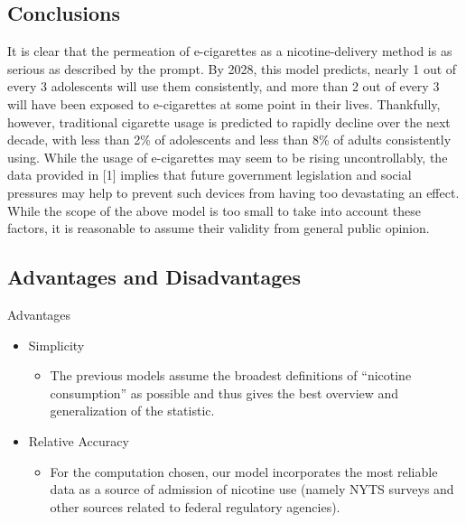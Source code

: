 \subsection{Conclusions}

It is clear that the permeation of e-cigarettes as a nicotine-delivery method is as serious as described by the prompt. By 2028, this model predicts, nearly 1 out of every 3 adolescents will use them consistently, and more than 2 out of every 3 will have been exposed to e-cigarettes at some point in their lives. Thankfully, however, traditional cigarette usage is predicted to rapidly decline over the next decade, with less than 2\% of adolescents and less than 8\% of adults consistently using. While the usage of e-cigarettes may seem to be rising uncontrollably, the data provided in [1] implies that future government legislation and social pressures may help to prevent such devices from having too devastating an effect. While the scope of the above model is too small to take into account these factors, it is reasonable to assume their validity from general public opinion. 

\subsection{Advantages and Disadvantages}

Advantages
\begin{itemize}
    \item Simplicity
    \begin{itemize}
        \item The previous models assume the broadest definitions of “nicotine consumption” as possible and thus gives the best overview and generalization of the statistic.
    \end{itemize}
    \item Relative Accuracy
    \begin{itemize}
        \item For the computation chosen, our model incorporates the most reliable data as a source of admission of nicotine use (namely NYTS surveys and other sources related to federal regulatory agencies).
    \end{itemize}
\end{itemize}

